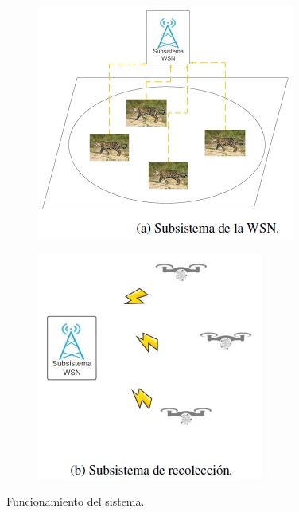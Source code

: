 \begin{figure}[h]
\centering
    \begin{subfigure}
        \centering
        \includegraphics[width=0.45\linewidth]{imagenes/fig4_a.jpg}
    \end{subfigure}    
    \hfill
    \begin{subfigure}
        \centering
        \includegraphics[width=0.45\linewidth]{imagenes/fig4_b.jpg}
    \end{subfigure}
    \caption{Funcionamiento del sistema.}
    \label{figura4}
\end{figure}


